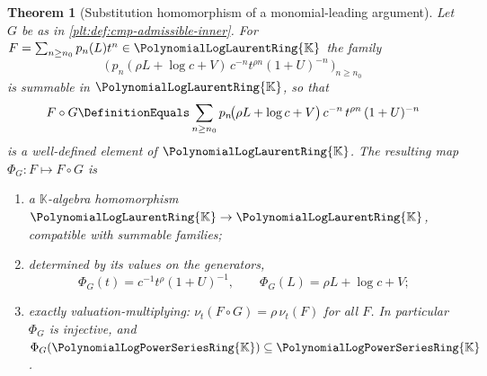 \documentclass[11pt,oneside]{article}
\theoremstyle{plain}
\newtheorem{theorem}{Theorem}[section]
\theoremstyle{definition}
\theoremstyle{remark}
\newcommand{\K}{\mathbb{K}}
\newcommand{\PLpow}{\PolynomialLogPowerSeriesRing{\K}}   %
\newcommand{\PLlau}{\PolynomialLogLaurentRing{\K}}       %
\newcommand{\ordt}{\nu_{t}}                              %
\newcommand{\compose}{\mathbin{\circ}}
\begin{document}
\begin{theorem}[Substitution homomorphism of a monomial-leading argument]
\label{plt:thm:cmp-substitution-hom}
Let \(G\) be as in \cref{plt:def:cmp-admissible-inner}.  For
\(F=\sum_{n\ge n_0}p_n(L)t^n\in\PLlau\) the family
\begin{equation}\label{plt:eq:cmp-master}
 \bigl(\,p_n(\rho L+\log c+V)\,c^{-n}t^{\rho n}(1+U)^{-n}\,\bigr)_{n\ge n_0}
\end{equation}
is summable in \(\PLlau\), so that
\begin{equation}\label{plt:eq:cmp-master-sum}
 F\compose G
 \DefinitionEquals
 \sum_{n\ge n_0}
 p_n\!\bigl(\rho L+\log c+V\bigr)\,
 c^{-n}\,t^{\rho n}\,(1+U)^{-n}
\end{equation}
is a well-defined element of \(\PLlau\).  The resulting map
\(\Phi_G:F\mapsto F\compose G\) is
\begin{enumerate}
\item a \(\K\)-algebra homomorphism \(\PLlau\to\PLlau\), compatible with
summable families;
\item determined by its values on the generators,
\begin{equation}\label{plt:eq:cmp-generator-images}
 \Phi_G(t)=c^{-1}t^{\rho}(1+U)^{-1},
 \qquad
 \Phi_G(L)=\rho L+\log c+V ;
\end{equation}
\item exactly valuation-multiplying:
\(\ordt(F\compose G)=\rho\,\ordt(F)\) for all \(F\).  In particular
\(\Phi_G\) is injective, and \(\Phi_G(\PLpow)\subseteq\PLpow\).
\end{enumerate}
\end{theorem}
\end{document}
